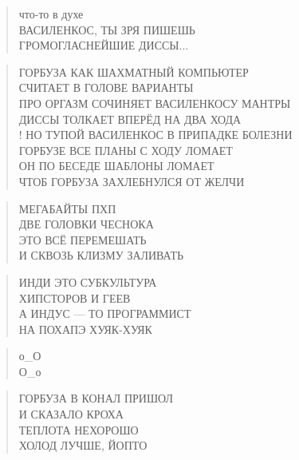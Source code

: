 \poemtitle{***}
\begin{verse}
что-то в духе\\
ВАСИЛЕНКОС, ТЫ ЗРЯ ПИШЕШЬ\\
ГРОМОГЛАСНЕЙШИЕ ДИССЫ...
\end{verse}

\poemtitle{***}
\begin{verse}
ГОРБУЗА КАК ШАХМАТНЫЙ КОМПЬЮТЕР\\
СЧИТАЕТ В ГОЛОВЕ ВАРИАНТЫ\\
ПРО ОРГАЗМ СОЧИНЯЕТ ВАСИЛЕНКОСУ МАНТРЫ\\
ДИССЫ ТОЛКАЕТ ВПЕРЁД НА ДВА ХОДА\\!
НО ТУПОЙ ВАСИЛЕНКОС В ПРИПАДКЕ БОЛЕЗНИ\\
ГОРБУЗЕ ВСЕ ПЛАНЫ С ХОДУ ЛОМАЕТ\\
ОН ПО БЕСЕДЕ ШАБЛОНЫ ЛОМАЕТ\\
ЧТОБ ГОРБУЗА ЗАХЛЕБНУЛСЯ ОТ ЖЕЛЧИ
\end{verse}

\poemtitle{***}
\begin{verse}
МЕГАБАЙТЫ ПХП\\
ДВЕ ГОЛОВКИ ЧЕСНОКА\\
ЭТО ВСЁ ПЕРЕМЕШАТЬ\\
И СКВОЗЬ КЛИЗМУ ЗАЛИВАТЬ
\end{verse}

\poemtitle{***}
\begin{verse}
ИНДИ ЭТО СУБКУЛЬТУРА\\
ХИПСТОРОВ И ГЕЕВ\\
А ИНДУС — ТО ПРОГРАММИСТ\\
НА ПОХАПЭ ХУЯК-ХУЯК
\end{verse}

\poemtitle{***}
\begin{verse}
о\_О\\
О\_о
\end{verse}

\poemtitle{***}
\begin{verse}
ГОРБУЗА В КОНАЛ ПРИШОЛ\\
И СКАЗАЛО КРОХА\\
ТЕПЛОТА НЕХОРОШО\\
ХОЛОД ЛУЧШЕ, ЙОПТО
\end{verse}

